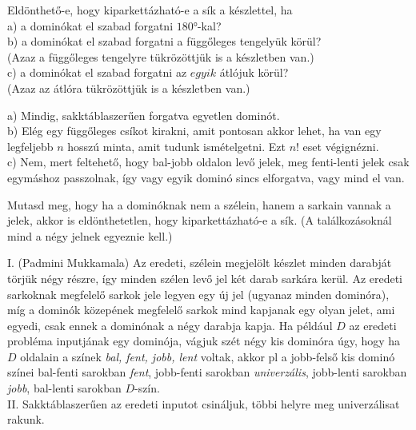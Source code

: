 \begin{Exercise}[counter={sorszam}, difficulty=0]\label{dominoforgatos}
	Eldönthet\H o-e, hogy kiparkettázható-e a sík a készlettel, ha\\
	a) a dominókat el szabad forgatni $180°$-kal?\\
	b) a dominókat el szabad forgatni a függ\H oleges tengelyük körül?\\
	(Azaz a függ\H oleges tengelyre t\"ukr\"oz\"ottj\"uk is a k\'eszletben van.)\\
	c) a dominókat el szabad forgatni az $egyik$ átlójuk körül?\\
	(Azaz az \'atl\'ora t\"ukr\"oz\"ottj\"uk is a k\'eszletben van.)
\end{Exercise}	
\begin{Answer}
	a) Mindig, sakkt\'ablaszer\H uen forgatva egyetlen domin\'ot.\\
	b) El\'eg egy f\"ugg\H oleges cs\'ikot kirakni, amit pontosan akkor lehet, ha van egy legfeljebb $n$ hossz\'u minta, amit tudunk ism\'etelgetni. Ezt $n!$ eset v\'egign\'ezni.\\
	c) Nem, mert feltehet\H o, hogy bal-jobb oldalon lev\H o jelek, meg fenti-lenti jelek csak egym\'ashoz passzolnak, \'igy vagy egyik domin\'o sincs elforgatva, vagy mind el van.
\end{Answer}

\begin{Exercise}[counter={sorszam}, difficulty=0]
	Mutasd meg, hogy ha a domin\'oknak nem a sz\'elein, hanem a sarkain vannak a jelek, akkor is eld\"onthetetlen, hogy kiparkettázható-e a sík. (A tal\'alkoz\'asokn\'al mind a n\'egy jelnek egyeznie kell.)
\end{Exercise}	
\begin{Answer}
	I. (Padmini Mukkamala) Az eredeti, sz\'elein megjel\"olt k\'eszlet minden darabj\'at t\"orj\"uk n\'egy r\'eszre, \'igy minden sz\'elen lev\H o jel k\'et darab sark\'ara ker\"ul. Az eredeti sarkoknak megfelel\H o sarkok jele legyen egy \'uj jel (ugyanaz minden domin\'ora), m\'ig a domin\'ok k\"ozep\'enek megfelel\H o sarkok mind kapjanak egy olyan jelet, ami egyedi, csak ennek a domin\'onak a n\'egy darabja kapja.
	Ha p\'eld\'aul $D$ az eredeti probl\'ema inputj\'anak egy domin\'oja, v\'agjuk sz\'et n\'egy kis domin\'ora \'ugy, hogy ha $D$ oldalain a sz\'inek \emph{bal, fent, jobb, lent} voltak, akkor pl a jobb-fels\H o kis domin\'o sz\'inei bal-fenti sarokban \emph{fent}, jobb-fenti sarokban \emph{univerz\'alis}, jobb-lenti sarokban \emph{jobb}, bal-lenti sarokban $D$-sz\'in.\\
	II. Sakkt\'ablaszer\H uen az eredeti inputot csin\'aljuk, t\"obbi helyre meg univerz\'alisat rakunk.
\end{Answer}

